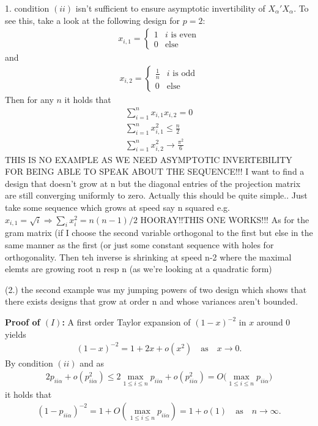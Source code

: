 \documentclass[Research_Module_ES.tex]{subfiles}
\begin{document}
1. 
condition $(ii)$ isn't sufficient to ensure asymptotic invertibility of $X_\alpha'X_\alpha$. To see this, take a look at the following design for $p=2$:
\begin{align*}
x_{i,1}= \begin{cases}
1 & \textrm{$i$ is even}\\
0 & \textrm{else}
\end{cases}
\end{align*}
and 
\begin{align*}
x_{i,2} = \begin{cases}
\frac{1}{n} & \textrm{$i$ is odd}\\
0 & \textrm{else}
\end{cases}
\end{align*}
Then for any $n$ it holds that
\begin{align*}
\sum_{i=1} ^n x_{i,1}x_{i,2} = 0 \\
\sum_{i=1} ^n x_{i,1}^2 \le \frac{n}{2}\\
\sum_{i=1} ^n x_{i,2}^2 \to \frac{\pi ^2}{6}
\end{align*}
THIS IS NO EXAMPLE AS WE NEED ASYMPTOTIC INVERTEBILITY FOR BEING ABLE TO SPEAK ABOUT THE SEQUENCE!!!
I want to find a design that doesn't grow at n but the diagonal entries of the projection matrix are still converging uniformly to zero. 
Actually this should be quite simple.. Just take some sequence which grows at speed say n squared 
e.g. $x_{i,1} = \sqrt{i} \Rightarrow \sum_i x_i^2 = n(n-1)/2$ 
HOORAY!!THIS ONE WORKS!!!
As for the gram matrix (if I choose the second variable orthogonal to the first but else in the same manner as the first (or just some constant sequence with holes for orthogonality. Then teh inverse is shrinking at speed n-2 where the maximal elemts are growing root n resp n (as we're looking at a quadratic form) 

(2.) the second example was my jumping powers of two design which shows that there exists designs that grow at order n and whose variances aren't bounded.

\textbf{Proof of $(I)$:} A first order Taylor expansion of $(1-x)^{-2}$ in $x$ around $0$ yields 
\begin{align*}
(1- x)^{-2} = 1+ 2 x + o(x^2) \quad \textrm{as} \quad x\to 0 .
\end{align*}
By condition $(ii)$ and as
\begin{align*}
2p_{ii\alpha} + o(p_{ii\alpha}^2) 
\le 2 \max_{1\le i \le n} p_{ii\alpha} +  o(p_{ii\alpha}^2) 
= O\bigl(\max _{1\le i \le n} p_{ii\alpha}\bigr)
\end{align*}
it holds that 
\begin{align*}
(1- p_{ii\alpha})^{-2} = 1+ O(\max _{1\le i \le n} p_{ii\alpha}) 
= 1 +o(1) \quad \textrm{as} \quad n \to \infty. 
\end{align*}
\end{document}
